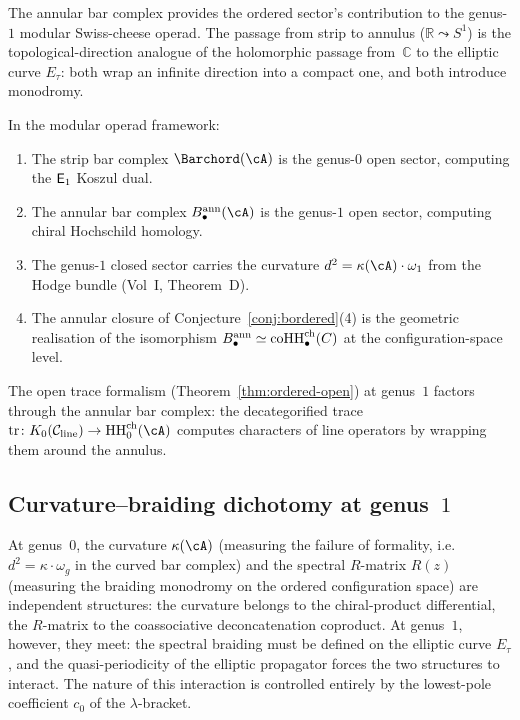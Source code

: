 \begin{remark}
\label{rem:annular-modular}
The annular bar complex provides the ordered sector's
contribution to the genus-$1$ modular Swiss-cheese operad.
The passage from strip to annulus
($\mathbb{R}\leadsto S^1$) is the topological-direction
analogue of the holomorphic passage from~$\mathbb{C}$ to the
elliptic curve $E_\tau$: both wrap an infinite direction into
a compact one, and both introduce monodromy.

In the modular operad framework:
\begin{enumerate}[label=(\roman*)]
\item The strip bar complex
 $\Barchord(\cA)$ is the genus-$0$ open sector,
 computing the $\mathsf{E}_1$ Koszul dual.
\item The annular bar complex
 $B^{\mathrm{ann}}_\bullet(\cA)$ is the genus-$1$ open
 sector, computing chiral Hochschild homology.
\item The genus-$1$ closed sector carries the curvature
 $d^2=\kappa(\cA)\cdot\omega_1$ from the Hodge bundle
 (Vol~I, Theorem~D).
\item The annular closure of
 Conjecture~\textup{\ref{conj:bordered}(4)} is the geometric
 realisation of the isomorphism
 $B^{\mathrm{ann}}_\bullet\simeq
 \operatorname{coHH}^{\mathrm{ch}}_\bullet(C)$
 at the configuration-space level.
\end{enumerate}
The open trace formalism (Theorem~\ref{thm:ordered-open})
at genus~$1$ factors through the annular bar complex: the
decategorified trace $\mathrm{tr}\colon K_0(\mathcal{C}_{\mathrm{line}})\to
\HH^{\mathrm{ch}}_0(\cA)$ computes characters of line operators
by wrapping them around the annulus.
\end{remark}

\subsection{Curvature--braiding dichotomy at genus~$1$}

At genus~$0$, the curvature $\kappa(\cA)$ (measuring the failure of
formality, i.e.\ $d^2=\kappa\cdot\omega_g$ in the curved bar complex)
and the spectral $R$-matrix $R(z)$ (measuring the braiding monodromy
on the ordered configuration space) are independent structures:
the curvature belongs to the chiral-product differential, the $R$-matrix to the coassociative deconcatenation coproduct.
At genus~$1$, however, they meet: the spectral braiding must be
defined on the elliptic curve $E_\tau$, and the quasi-periodicity
of the elliptic propagator forces the two structures to interact.
The nature of this interaction is controlled entirely by the
lowest-pole coefficient $c_0$ of the $\lambda$-bracket.

